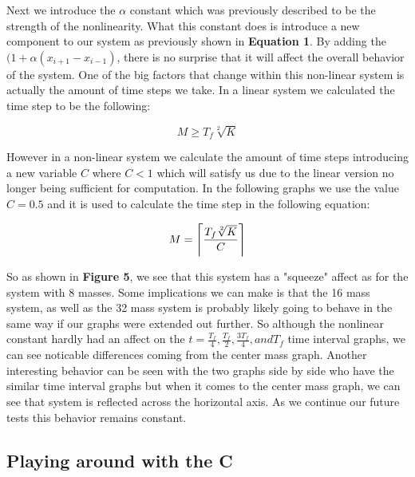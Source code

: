 Next we introduce the $\alpha$ constant which was previously described to be the strength of the nonlinearity. What this constant does is introduce a new component to our system as previously shown in \textbf{Equation 1}. By adding the $(1+\alpha(x_{i+1}-x_{i-1})$, there is no surprise that it will affect the overall behavior of the system. One of the big factors that change within this non-linear system is actually the amount of time steps we take. In a linear system we calculated the time step to be the following:

\begin{equation}
\label{FPUT system of ODE's}
M \ge T_{f} \sqrt[2]{K}
\end{equation}

However in a non-linear system we calculate the amount of time steps introducing a new variable $C$ where $C < 1$ which will satisfy us due to the linear version no longer being sufficient for computation. In the following graphs we use the value $C = 0.5$ and it is used to calculate the time step in the following equation: 

\begin{equation}
\label{FPUT system of ODE's}
M = \ceil * {\frac{T_{f} \sqrt[2]{K}}{C}}
\end{equation}
 
So as shown in \textbf{Figure 5}, we see that this system has a "squeeze" affect as for the system with 8 masses. Some implications we can make is that the 16 mass system, as well as the 32 mass system is probably likely going to behave in the same way if our graphs were extended out further. So although the nonlinear constant hardly had an affect on the $t=\frac{T_{f}}{4},\frac{T_{f}}{2}, \frac{3T_{f}}{4}, and T_{f}$ time interval graphs, we can see noticable differences coming from the center mass graph. Another interesting behavior can be seen with the two graphs side by side who have the similar time interval graphs but when it comes to the center mass graph, we can see that system is reflected across the horizontal axis. As we continue our future tests this behavior remains constant.

\subsection{Playing around with the C}

